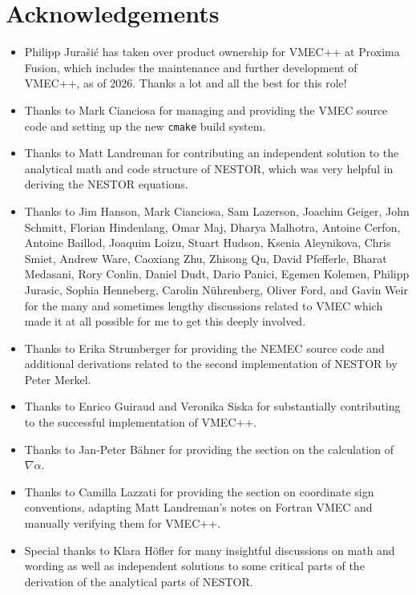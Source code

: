 \documentclass[a4paper,11pt]{book}
\begin{document}












\chapter{Acknowledgements}
%
\begin{itemize}
 \item Philipp Jurašić has taken over product ownership for VMEC++ at Proxima Fusion, which includes the maintenance and further development of VMEC++, as of 2026. Thanks a lot and all the best for this role!
 \item Thanks to Mark Cianciosa for managing and providing the VMEC source code and setting up the new \texttt{cmake} build system.
 \item Thanks to Matt Landreman for contributing an independent solution to the analytical math and code structure of NESTOR,
       which was very helpful in deriving the NESTOR equations.
 \item Thanks to
       Jim Hanson,
       Mark Cianciosa,
       Sam Lazerson,
       Joachim Geiger,
       John Schmitt,
       Florian Hindenlang,
       Omar Maj,
       Dharya Malhotra,
       Antoine Cerfon,
       Antoine Baillod,
       Joaquim Loizu,
       Stuart Hudson,
       Ksenia Aleynikova,
       Chris Smiet,
       Andrew Ware,
       Caoxiang Zhu,
       Zhisong Qu,
       David Pfefferle,
       Bharat Medasani,
       Rory Conlin,
       Daniel Dudt,
       Dario Panici,
       Egemen Kolemen,
       Philipp Jurasic,
       Sophia Henneberg,
       Carolin Nührenberg,
       Oliver Ford,
       and
       Gavin Weir
       for the many and sometimes lengthy discussions
       related to VMEC which made it at all possible for me to get this deeply involved.
 \item Thanks to Erika Strumberger for providing the NEMEC source code and additional derivations related
       to the second implementation of NESTOR by Peter Merkel.
 \item Thanks to Enrico Guiraud and Veronika Siska for substantially contributing to the successful implementation of VMEC++.
 \item Thanks to Jan-Peter Bähner for providing the section on the calculation of $\nabla \alpha$.
 \item Thanks to Camilla Lazzati for providing the section on coordinate sign conventions,
       adapting Matt Landreman's notes on Fortran VMEC and manually verifying them for VMEC++.
 \item Special thanks to Klara Höfler for many insightful discussions on math and wording
       as well as independent solutions to some critical parts of the derivation of the analytical parts of NESTOR.
 \end{itemize}

\printbibliography
\end{document}
